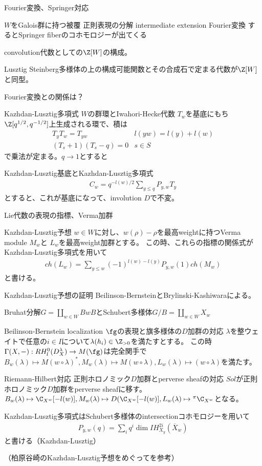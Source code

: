 \documentclass[dvipdfmx]{beamer}
\begin{document}
\begin{frame}
Fourier変換、Springer対応

$W$をGalois群に持つ被覆
正則表現の分解
intermediate extension
Fourier変換
するとSpringer fiberのコホモロジーが出てくる
\end{frame}

\begin{frame}
convolution代数としての$\Z[W]$の構成。

Lusztig
Steinberg多様体の上の構成可能関数とその合成石で定まる代数が$\Z[W]$と同型。

Fourier変換との関係は？
\end{frame}

\begin{frame}
Kazhdan-Lusztig多項式
$W$の群環とIwahori-Hecke代数
$T_w$を基底にもち$\Z[q^{1/2}, q^{-1/2}]$上生成される環で、積は
\begin{align*}
T_yT_w=T_{yw}& l(yw)=l(y)+l(w)\\
(T_s+1)(T_s-q)=0 & s\in S
\end{align*}
で乗法が定まる。$q \to 1$とすると

Kazhdan-Lusztig基底とKazhdan-Lusztig多項式
\begin{align*}
C_w=q^{-l(w)/2}\sum_{y\leq q}P_{y,w}T_y
\end{align*}
とすると、これが基底になって、involution $D$で不変。

Lie代数の表現の指標、Verma加群

Kazhdan-Lusztig予想
$w\in W$に対し、$w(\rho)-\rho$を最高weightに持つVerma module $M_w$と
$L_w$を最高weight加群とする。
この時、これらの指標の関係式がKazhdan-Lusztig多項式を用いて
\begin{align*}
ch(L_w)=\sum_{y\leq w}(-1)^{l(w)-l(y)}P_{y,w}(1)ch(M_w)
\end{align*}
と書ける。
\end{frame}

\begin{frame}{Kazhdan-Lusztig予想の証明}
Beilinson-BernsteinとBrylinski-Kashiwaraによる。

Bruhat分解$G=\coprod_{w\in W}BwB$とSchubert多様体$G/B=\coprod_{w\in W}X_w$

Beilinson-Bernstein localization
$\fg$の表現と旗多様体の$D$加群の対応
$\lambda$を整ウェイトで任意の$i\in I$について$\lambda(h_i)\in\Z_{>0}$を満たすとする。
この時$\Gamma(X,-):RH^0_l(D^\lambda_X) \to M(\fg)$は完全関手で
$B_w(\lambda)\mapsto M(w\circ\lambda)^*, M_w(\lambda)\mapsto M(w\circ\lambda), L_w(\lambda)\mapsto(w\circ\lambda)$を満たす。

Riemann-Hilbert対応
正則ホロノミック$D$加群とperverse sheafの対応
$Sol$が正則ホロノミック$D$加群をperverse sheafに移す。
$B_w(\lambda)\mapsto \C_{X^w}[-l(w)], M_w(\lambda)\mapsto D(\C_{X^w}[-l(w)],L_w(\lambda)\mapsto {}^\pi\C_{X^w}$となる。

Kazhdan-Lusztig多項式はSchubert多様体のintersectionコホモロジーを用いて
\begin{align*}
P_{y,w}(q)=\sum_iq^i\dim IH_{X_y}^{2i}(\overline{X}_w)
\end{align*}
と書ける（Kazhdan-Lusztig）

（柏原谷崎のKazhdan-Lusztig予想をめぐってを参考）
\end{frame}
\end{document}
